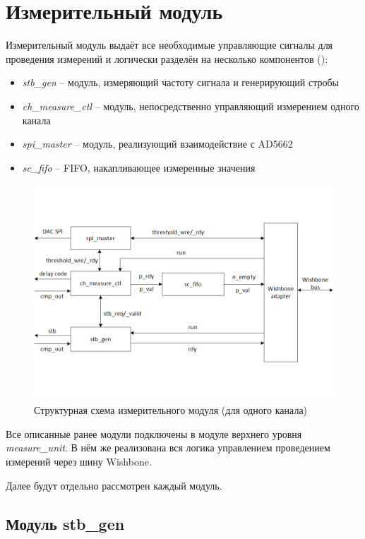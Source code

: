 \section{Измерительный модуль}

Измерительный модуль выдаёт все необходимые управляющие сигналы для проведения измерений и логически разделён на несколько компонентов ():

\begin{itemize}
	\item \emph{stb\_gen} -- модуль, измеряющий частоту сигнала и генерирующий стробы
	\item \emph{ch\_measure\_ctl} -- модуль, непосредственно управляющий измерением одного канала
	\item \emph{spi\_master} -- модуль, реализующий взаимодействие с AD5662
	\item \emph{sc\_fifo} -- FIFO, накапливающее измеренные значения
\end{itemize}

\begin{figure}[ht!] 
	\center
	\includegraphics [scale=0.7] {my_folder/images//mu_struct}
	\caption{Структурная схема измерительного модуля (для одного канала)} 
	\label{fig:mu-struct}  
\end{figure}

Все описанные ранее модули подключены в модуле верхнего уровня \emph{measure\_unit}. В нём же
реализована вся логика управлением проведением измерений через шину Wishbone.

Далее будут отдельно рассмотрен каждый модуль.

\subsection{Модуль stb\_gen}

\newpage